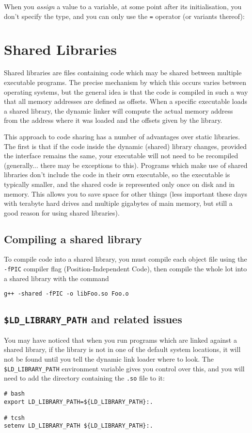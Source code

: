\documentclass[a4paper]{scrartcl}
\begin{document}
When you \emph{assign} a value to a variable, at some point after its initialisation, you don't specify the type, and you can only use the \verb|=| operator (or variants thereof):



\section{Shared Libraries}
Shared libraries are files containing code which may be shared between multiple executable programs. The precise mechanism by which this occurs varies between operating systems, but the general idea is that the code is compiled in such a way that all memory addresses are defined as offsets. When a specific executable loads a shared library, the dynamic linker will compute the actual memory address from the address where it was loaded and the offsets given by the library.

This approach to code sharing has a number of advantages over static libraries. The first is that if the code inside the dynamic (shared) library changes, provided the interface remains the same, your executable will not need to be recompiled (generally... there may be exceptions to this). Programs which make use of shared libraries don't include the code in their own executable, so the executable is typically smaller, and the shared code is represented only once on disk and in memory. This allows you to save space for other things (less important these days with terabyte hard drives and multiple gigabytes of main memory, but still a good reason for using shared libraries).

\subsection{Compiling a shared library}
To compile code into a shared library, you must compile each object file using the \verb|-fPIC| compiler flag (Position-Independent Code), then compile the whole lot into a shared library with the command
\begin{verbatim}
g++ -shared -fPIC -o libFoo.so Foo.o
\end{verbatim}

\subsection{\texttt{\$LD\_LIBRARY\_PATH} and related issues}
You may have noticed that when you run programs which are linked against a shared library, if the library is not in one of the default system locations, it will not be found until you tell the dynamic link loader where to look. The \verb|$LD_LIBRARY_PATH| environment variable gives you control over this, and you will need to add the directory containing the \verb|.so| file to it:
\begin{verbatim}
# bash
export LD_LIBRARY_PATH=${LD_LIBRARY_PATH}:.

# tcsh
setenv LD_LIBRARY_PATH ${LD_LIBRARY_PATH}:.
\end{verbatim}
\end{document}
